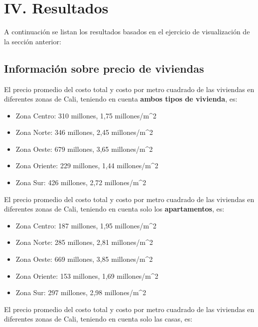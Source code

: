 \documentclass[conference,final,]{IEEEtran}
\providecommand{\tightlist}{%
  \setlength{\itemsep}{0pt}\setlength{\parskip}{0pt}}
\begin{document}
\section{IV. Resultados}

A continuación se listan los resultados basados en el ejercicio de
visualización de la sección anterior:

\subsection{\textbf{Información sobre precio de viviendas}}

El precio promedio del costo total y costo por metro cuadrado de las
viviendas en diferentes zonas de Cali, teniendo en cuenta \textbf{ambos
tipos de vivienda}, es:\\

\begin{itemize}
\tightlist
\item
  Zona Centro: 310 millones, 1,75 millones/m\^{}2
\item
  Zona Norte: 346 millones, 2,45 millones/m\^{}2
\item
  Zona Oeste: 679 millones, 3,65 millones/m\^{}2
\item
  Zona Oriente: 229 millones, 1,44 millones/m\^{}2
\item
  Zona Sur: 426 millones, 2,72 millones/m\^{}2
\end{itemize}

El precio promedio del costo total y costo por metro cuadrado de las
viviendas en diferentes zonas de Cali, teniendo en cuenta solo los
\textbf{apartamentos}, es:\\

\begin{itemize}
\tightlist
\item
  Zona Centro: 187 millones, 1,95 millones/m\^{}2
\item
  Zona Norte: 285 millones, 2,81 millones/m\^{}2
\item
  Zona Oeste: 669 millones, 3,85 millones/m\^{}2
\item
  Zona Oriente: 153 millones, 1,69 millones/m\^{}2
\item
  Zona Sur: 297 millones, 2,98 millones/m\^{}2
\end{itemize}

El precio promedio del costo total y costo por metro cuadrado de las
viviendas en diferentes zonas de Cali, teniendo en cuenta solo las
casas, es:\\
\end{document}
